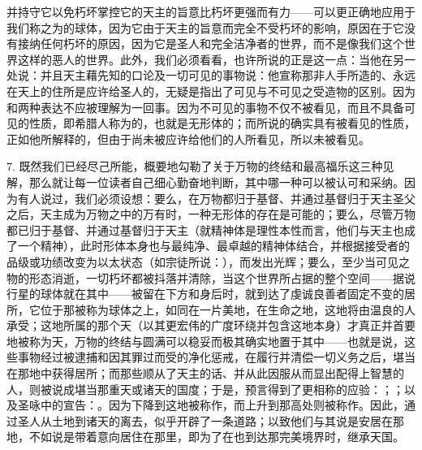 并持守它以免朽坏掌控它的天主的旨意比朽坏更强而有力——可以更正确地应用于我们称之为的球体，因为它由于天主的旨意而完全不受朽坏的影响，原因在于它没有接纳任何朽坏的原因，因为它是圣人和完全洁净者的世界，而不是像我们这个世界这样的恶人的世界。此外，我们必须看看，也许所说的正是这一点：当他在另一处说：并且天主藉先知的口论及一切可见的事物说：他宣称那非人手所造的、永远在天上的住所是应许给圣人的，无疑是指出了可见与不可见之受造物的区别。因为和两种表达不应被理解为一回事。因为不可见的事物不仅不被看见，而且不具备可见的性质，即希腊人称为的，也就是无形体的；而所说的确实具有被看见的性质，正如他所解释的，但由于尚未被应许给他们的人所看见，所以未被看见。\par

7. 既然我们已经尽己所能，概要地勾勒了关于万物的终结和最高福乐这三种见解，那么就让每一位读者自己细心勤奋地判断，其中哪一种可以被认可和采纳。因为有人说过，我们必须设想：要么，在万物都归于基督、并通过基督归于天主圣父之后，天主成为万物之中的万有时，一种无形体的存在是可能的；要么，尽管万物都已归于基督、并通过基督归于天主（就精神体是理性本性而言，他们与天主也成了一个精神），此时形体本身也与最纯净、最卓越的精神体结合，并根据接受者的品级或功绩改变为以太状态（如宗徒所说：），而发出光辉；要么，至少当可见之物的形态消逝，一切朽坏都被抖落并清除，当这个世界所占据的整个空间——据说行星的球体就在其中——被留在下方和身后时，就到达了虔诚良善者固定不变的居所，它位于那被称为球体之上，如同在一片美地，在生命之地，这地将由温良的人承受；这地所属的那个天（以其更宏伟的广度环绕并包含这地本身）才真正并首要地被称为天，万物的终结与圆满可以稳妥而极其确实地置于其中——也就是说，这些事物经过被逮捕和因其罪过而受的净化惩戒，在履行并清偿一切义务之后，堪当在那地中获得居所；而那些顺从了天主的话、并从此因服从而显出配得上智慧的人，则被说成堪当那重天或诸天的国度；于是，预言得到了更相称的应验：；；以及圣咏中的宣告：。因为下降到这地被称作，而上升到那高处则被称作。因此，通过圣人从土地到诸天的离去，似乎开辟了一条道路；以致他们与其说是安居在那地，不如说是带着意向居住在那里，即为了在也到达那完美境界时，继承天国。\par

